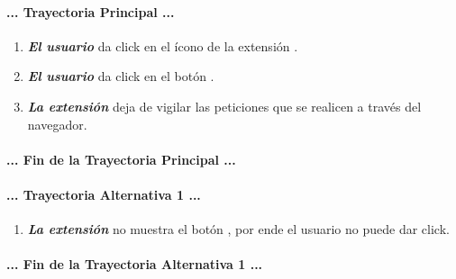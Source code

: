 \documentclass[12pt, a4paper, titlepage]{report}
\newcommand*{\img}[1]{%
    \raisebox{-.3\baselineskip}{%
        \texttt{[image: \#1]}%
    }%
}
\begin{document}
				\paragraph{... Trayectoria Principal ...}
				\begin{enumerate}
					
					\item \textbf{\textit{El usuario}} da click en el ícono de la extensión \img{imagenes/Disenio/Componente_1/UI_icon_escom.png}.
					
					\item \textbf{\textit{El usuario}} da click en el botón \img{imagenes/Disenio/Componente_1/UI_btn_deactivate.png}.
					
					\item \textbf{\textit{La extensión}} deja de vigilar las peticiones que se realicen a través del navegador.
				
				\end{enumerate}
				\paragraph{... Fin de la Trayectoria Principal ...}
				
		        \paragraph{... Trayectoria Alternativa 1 ...}
				\begin{enumerate}
				     \item \textbf{\textit{La extensión}} no muestra el botón \img{imagenes/Disenio/Componente_1/UI_btn_deactivate.png}, por ende el usuario no puede dar click.
				\end{enumerate}
				\paragraph{... Fin de la Trayectoria Alternativa 1 ...}
				\newpage 
				
\end{document}
